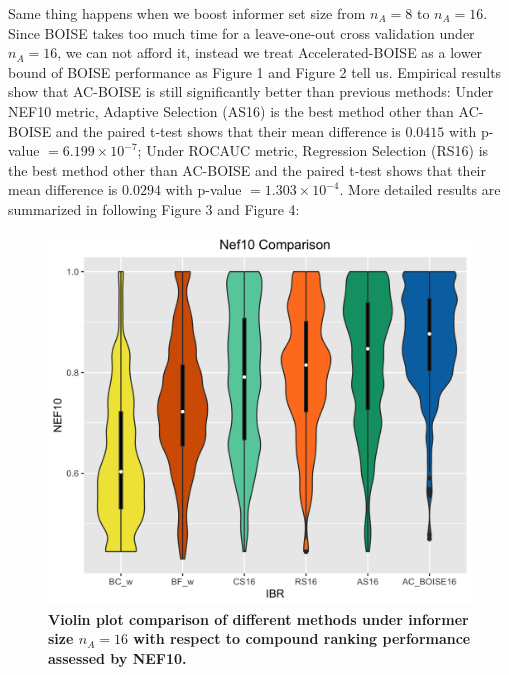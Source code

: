 \documentclass[12pt]{article}
\begin{document}
Same thing happens when we boost informer set size from $n_A = 8$ to $n_A = 16$. Since BOISE takes too much time for a leave-one-out cross validation under $n_A=16$, we can not afford it, instead we treat Accelerated-BOISE as a lower bound of BOISE performance as Figure 1 and Figure 2 tell us. Empirical results show that AC-BOISE is still significantly better than previous methods: Under NEF10 metric, Adaptive Selection (AS16) is the best method other than AC-BOISE and the paired t-test shows that their mean difference is $0.0415$ with p-value $=6.199\times 10^{-7}$;  Under ROCAUC metric, Regression Selection (RS16) is the best method other than AC-BOISE and the paired t-test shows that their mean difference is $0.0294$ with p-value $=1.303\times 10^{-4}$. More detailed results are summarized in following Figure 3 and Figure 4:
\begin{figure}[!ht]
\caption{\label{fig:nef2} 
{\bf Violin plot comparison of different methods under informer size $n_A =16$ with respect to compound ranking performance assessed by NEF10.}} 
\centering
\includegraphics[width=5.0in]{pkis1_16_NEF10_AC.png}
\end{figure}
\end{document}
